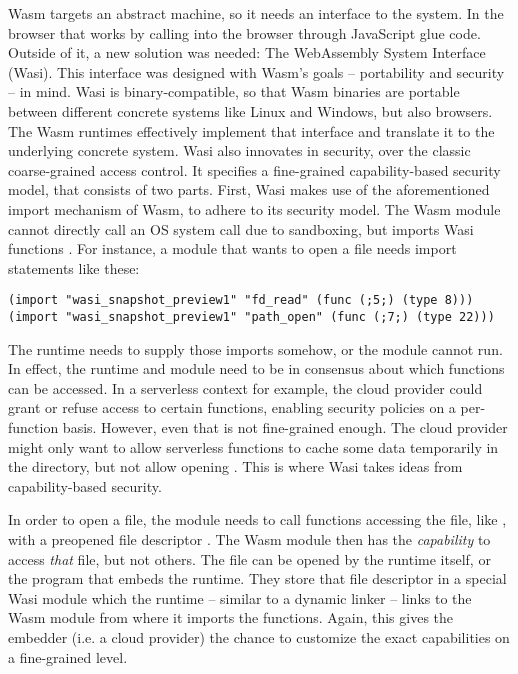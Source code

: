 Wasm targets an abstract machine, so it needs an interface to the system. In the browser that works by calling into the browser through JavaScript glue code. Outside of it, a new solution was needed: The WebAssembly System Interface (Wasi). This interface was designed with Wasm's goals -- portability and security -- in mind.
Wasi is binary-compatible, so that Wasm binaries are portable between different concrete systems like Linux and Windows, but also browsers. The Wasm runtimes effectively implement that interface and translate it to the underlying concrete system.
Wasi also innovates in security, over the classic coarse-grained access control. It specifies a fine-grained capability-based security model, that consists of two parts. First, Wasi makes use of the aforementioned import mechanism of Wasm, to adhere to its security model. The Wasm module cannot directly call an OS system call due to sandboxing, but imports Wasi functions \cite{Clark2019}. For instance, a module that wants to open a file needs import statements like these:

\begin{verbatim}
(import "wasi_snapshot_preview1" "fd_read" (func (;5;) (type 8)))
(import "wasi_snapshot_preview1" "path_open" (func (;7;) (type 22)))
\end{verbatim}

The runtime needs to supply those imports somehow, or the module cannot run. In effect, the runtime and module need to be in consensus about which functions can be accessed. In a serverless context for example, the cloud provider could grant or refuse access to certain functions, enabling security policies on a per-function basis. However, even that is not fine-grained enough. The cloud provider might only want to allow serverless functions to cache some data temporarily in the  directory, but not allow opening . This is where Wasi takes ideas from capability-based security.

In order to open a file, the module needs to call functions accessing the file, like , with a preopened file descriptor \cite{Clark2019}. The Wasm module then has the \emph{capability} to access \emph{that} file, but not others. The file can be opened by the runtime itself, or the program that embeds the runtime. They store that file descriptor in a special Wasi module which the runtime -- similar to a dynamic linker -- links to the Wasm module from where it imports the functions. Again, this gives the embedder (i.e. a cloud provider) the chance to customize the exact capabilities on a fine-grained level.

